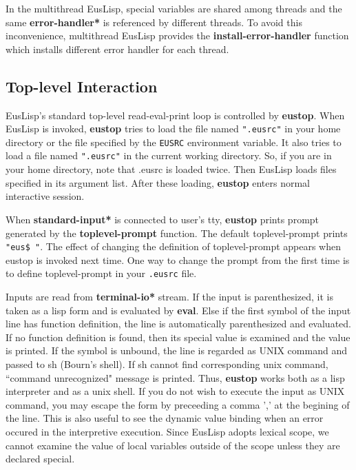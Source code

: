 In the multithread EusLisp, special variables are shared among threads
and the same {\bf *error-handler*} is referenced by different threads.
To avoid this inconvenience, multithread EusLisp provides
the {\bf install-error-handler} function which installs different
error handler for each thread.

\begin{refdesc}

\end{refdesc}

\newpage

\subsection{Top-level Interaction}

EusLisp's standard top-level read-eval-print loop is controlled by {\bf eustop}.
When EusLisp is invoked,
{\bf eustop} tries to load the file named {\tt ".eusrc"} in your home directory
or the file specified by the {\tt EUSRC} environment variable.
It also tries to load a file named {\tt ".eusrc"} in the current working
directory.  So, if you are in your home directory, note that .eusrc is
loaded twice.
Then EusLisp loads files specified in its argument list.
After these loading, {\bf eustop} enters normal interactive session.

When {\bf *standard-input*} is connected to user's tty,
{\bf eustop} prints prompt generated by the {\bf toplevel-prompt} function.
The default toplevel-prompt prints {\tt "eus\$ "}.
The effect of changing the definition of toplevel-prompt appears
when eustop is invoked next time.
One way to change the prompt from the first time is to define
toplevel-prompt in your {\tt .eusrc} file.

Inputs are read from {\bf *terminal-io*} stream.
If the input is parenthesized, it is taken as a lisp form and
is evaluated by {\bf eval}.
Else if the first symbol of the input line has function definition,
the line is automatically parenthesized and evaluated.
If no function definition is found,
then its special value is examined and the value is printed.
If the symbol is unbound,
the line is regarded as UNIX command and passed to sh (Bourn's shell).
If sh cannot find corresponding unix command,
``command unrecognized" message is printed.
Thus, {\bf eustop} works both as a lisp interpreter and as a unix shell.
If you do not wish to execute the input as UNIX command,
you may escape the form by preceeding a comma ',' at the begining of the line.
This is also useful to see the dynamic value binding when
an error occured in the interpretive execution.
Since EusLisp adopts lexical scope,
we cannot examine the value of local variables outside of the scope
unless they are declared special.

